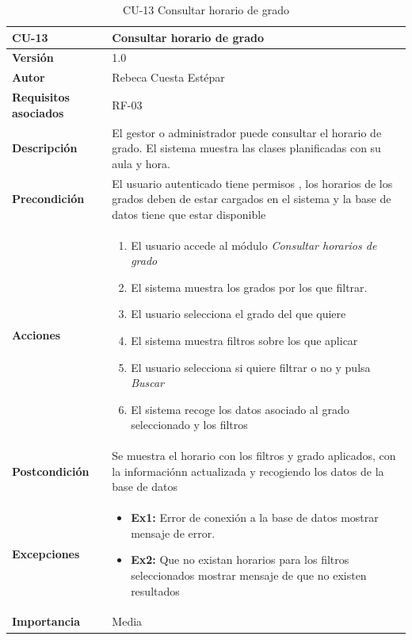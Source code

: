 \begin{table}[p]
	\centering
	\begin{tabularx}{\linewidth}{ p{} p{} }
		\toprule
		\textbf{CU-13}    & \textbf{Consultar horario de grado}\\
		\toprule
		\textbf{Versión}              & 1.0    \\
		\textbf{Autor}                & Rebeca Cuesta Estépar \\
		\textbf{Requisitos asociados} & RF-03 \\
		\textbf{Descripción}          & El gestor o administrador puede consultar el horario de grado. El sistema muestra las clases planificadas con su aula y hora.  \\
		\textbf{Precondición}         &  El usuario autenticado tiene permisos , los horarios de los grados deben de estar cargados en el sistema y la base de datos tiene que estar disponible \\
		\textbf{Acciones}             &
		\begin{enumerate}
			\def\labelenumi{\arabic{enumi}.}
			\tightlist
			\item El usuario accede al módulo \emph{Consultar horarios de grado}
			\item El sistema muestra los grados por los que filtrar.
			\item El usuario selecciona el grado del que quiere
			\item El sistema muestra filtros sobre los que aplicar 
			\item El usuario selecciona si quiere filtrar o no y pulsa \emph{Buscar}
			\item El sistema recoge los datos asociado al grado seleccionado y los filtros
		\end{enumerate}\\
		\textbf{Postcondición} & Se muestra el horario con los filtros y grado aplicados, con la informaciónn actualizada y recogiendo los datos de la base de datos        \\
		\textbf{Excepciones}          & 
		\begin{itemize}[itemsep=0.15em, parsep=0pt, topsep=0pt, leftmargin=*]
			\tightlist
			\item \textbf{Ex1:} Error de conexión a la base de datos \textrightarrow mostrar mensaje de error.
			\item \textbf{Ex2:} Que no existan horarios para los filtros seleccionados \textrightarrow mostrar mensaje de que no existen resultados
		\end{itemize} \\
		\textbf{Importancia}          & Media \\
		\bottomrule
	\end{tabularx}
	\caption{CU-13 Consultar horario de grado}
\end{table}

